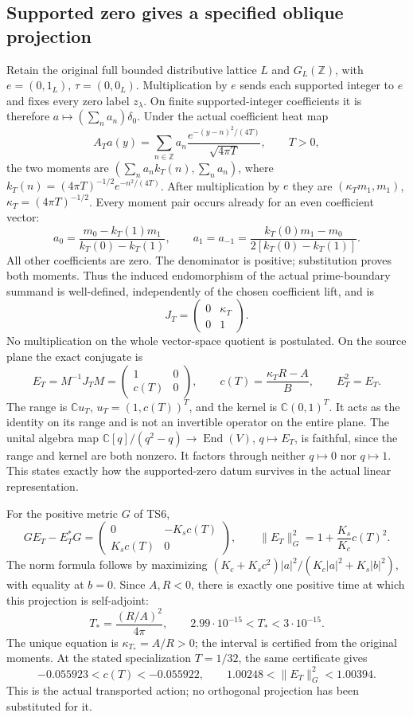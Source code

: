 \subsection{Supported zero gives a specified oblique projection}
Retain the original full bounded distributive lattice \(L\) and
\(G_L(\mathbb Z)\), with \(e=(0,1_L)\),
\(\tau=(0,0_L)\). Multiplication by \(e\) sends each supported
integer to \(e\) and fixes every zero label \(z_\lambda\).
On finite supported-integer coefficients it is therefore
\(a\mapsto(\sum_n a_n)\delta_0\). Under the actual coefficient
heat map
\[
 A_Ta(y)=\sum_{n\in\mathbb Z}a_n
       \frac{e^{-(y-n)^2/(4T)}}{\sqrt{4\pi T}},\qquad T>0,
\]
the two moments are \((\sum_na_nk_T(n),\sum_na_n)\),
where \(k_T(n)=(4\pi T)^{-1/2}e^{-n^2/(4T)}\).
After multiplication by \(e\) they are
\((\kappa_T m_1,m_1)\), \(\kappa_T=(4\pi T)^{-1/2}\).
Every moment pair occurs already for an even coefficient vector:
\[
 a_0=\frac{m_0-k_T(1)m_1}{k_T(0)-k_T(1)},\qquad
 a_1=a_{-1}=\frac{k_T(0)m_1-m_0}{2[k_T(0)-k_T(1)]}.
 \tag{TS17}
\]
All other coefficients are zero. The denominator is positive;
substitution proves both moments. Thus the induced endomorphism
of the actual prime-boundary summand is well-defined, independently
of the chosen coefficient lift, and is
\[
 J_T=\begin{pmatrix}0&\kappa_T\\0&1\end{pmatrix}.
 \tag{TS18}
\]
No multiplication on the whole vector-space quotient is postulated.
On the source plane the exact conjugate is
\[
 E_T=M^{-1}J_TM=\begin{pmatrix}1&0\\c(T)&0\end{pmatrix},
 \qquad c(T)=\frac{\kappa_T R-A}{B},\qquad E_T^2=E_T.
 \tag{TS19}
\]
The range is \(\mathbb C u_T\), \(u_T=(1,c(T))^T\), and
the kernel is \(\mathbb C(0,1)^T\). It acts as the identity on
its range and is not an invertible operator on the entire plane.
The unital algebra map \(\mathbb C[q]/(q^2-q)\to\operatorname{End}(V)\),
\(q\mapsto E_T\), is faithful, since the range and kernel are
both nonzero. It factors through neither \(q\mapsto0\) nor
\(q\mapsto1\). This states exactly how the supported-zero datum
survives in the actual linear representation.

For the positive metric \(G\) of TS6,
\[
 GE_T-E_T^*G=
 \begin{pmatrix}0&-K_sc(T)\\K_sc(T)&0\end{pmatrix},\qquad
 \|E_T\|_G^2=1+\frac{K_s}{K_c}c(T)^2.
 \tag{TS20}
\]
The norm formula follows by maximizing
\((K_c+K_sc^2)|a|^2/(K_c|a|^2+K_s|b|^2)\), with equality
at \(b=0\). Since \(A,R<0\), there is exactly one positive
time at which this projection is self-adjoint:
\[
 \boxed{T_*=\frac{(R/A)^2}{4\pi},\qquad
 2.99\cdot10^{-15}<T_*<3\cdot10^{-15}.}\tag{TS21}
\]
The unique equation is \(\kappa_{T_*}=A/R>0\); the interval
is certified from the original moments. At the stated specialization
\(T=1/32\), the same certificate gives
\[
 -0.055923<c(T)<-0.055922,\qquad
 1.00248<\|E_T\|_G^2<1.00394.\tag{TS22}
\]
This is the actual transported action; no orthogonal projection
has been substituted for it.

